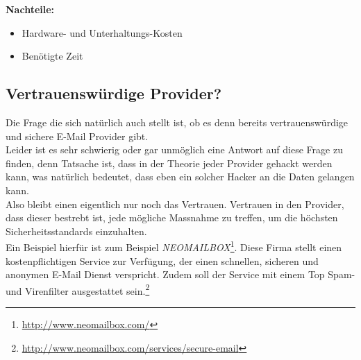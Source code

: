 \textbf{Nachteile:}
\begin{itemize}
    \item Hardware- und Unterhaltungs-Kosten
    \item Benötigte Zeit
\end{itemize}

\subsection{Vertrauenswürdige Provider?}
Die Frage die sich natürlich auch stellt ist, ob es denn bereits vertrauenswürdige und sichere E-Mail Provider gibt. \\
Leider ist es sehr schwierig oder gar unmöglich eine Antwort auf diese Frage zu finden, denn Tatsache ist, dass in der Theorie jeder Provider gehackt werden kann, was natürlich bedeutet, dass eben ein solcher Hacker an die Daten gelangen kann. \\
Also bleibt einen eigentlich nur noch das Vertrauen. Vertrauen in den Provider, dass dieser bestrebt ist, jede mögliche Massnahme zu treffen, um die höchsten Sicherheitsstandards einzuhalten. \\
Ein Beispiel hierfür ist zum Beispiel \textit{NEOMAILBOX}\footnote{\url{http://www.neomailbox.com/}}. Diese Firma stellt einen kostenpflichtigen Service zur Verfügung, der einen schnellen, sicheren und anonymen E-Mail Dienst verspricht. Zudem soll der Service mit einem Top Spam- und Virenfilter ausgestattet sein.\footnote{\url{http://www.neomailbox.com/services/secure-email}}
